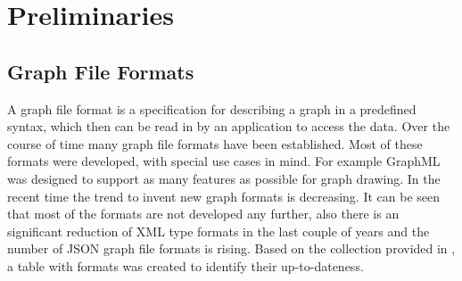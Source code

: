 \chapter{Preliminaries}
\label{Preliminaries}
\section{Graph File Formats}
A graph file format is a specification for describing a graph in a predefined syntax, which then can be read in by an application to access the data. Over the course of time many graph file formats have been established. Most of these formats were developed, with special use cases in mind. For example GraphML was designed to support as many features as possible for graph drawing\cite{Roughan.10.03.2015}.
In the recent time the trend to invent new graph formats is decreasing. It can be seen  that most of the formats are not developed any further, also there is an significant reduction of XML type formats in the last couple of years and the number of JSON graph file formats is rising\cite{Roughan.10.03.2015}.
Based on the collection provided in \cite{Roughan.10.03.2015}, a table with formats was created to identify their up-to-dateness.

